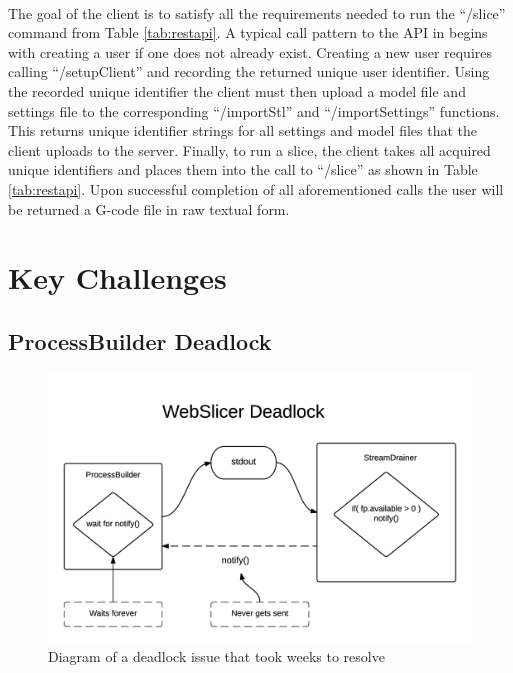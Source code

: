 \paragraph{}
The goal of the client is to satisfy all the requirements needed to run the ``/slice'' command from Table \ref{tab:restapi}.
A typical call pattern to the API in begins with creating a user if one does not already exist.
Creating a new user requires calling ``/setupClient'' and recording the returned unique user identifier.
Using the recorded unique identifier the client must then upload a model file and settings file to the corresponding ``/importStl'' and ``/importSettings'' functions.
This returns unique identifier strings for all settings and model files that the client uploads to the server.
Finally, to run a slice, the client takes all acquired unique identifiers and places them into the call to ``/slice'' as shown in Table \ref{tab:restapi}.
Upon successful completion of all aforementioned calls the user will be returned a G-code file in raw textual form.


\section{Key Challenges}
\subsection{ProcessBuilder Deadlock}
\begin{figure}[!ht]
  \centering
  \includegraphics[width=\linewidth]{diagrams/Deadlock-Diagram}
  \caption{Diagram of a deadlock issue that took weeks to resolve}
  \label{fig:deadlock-diagram}
\end{figure}
